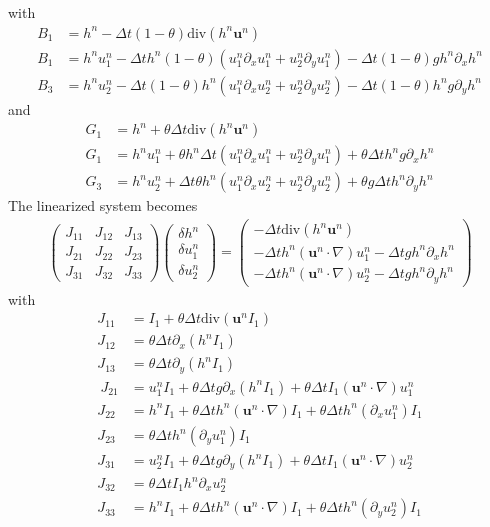 \documentclass[a4paper, 11pt]{article}
\begin{document}
with
\begin{align*}
B_{1} &= h^n-\Delta t(1-\theta)\text{div}(h^n\boldsymbol{u}^n)\\
B_{1} & = h^nu_1^n-\Delta th^n(1-\theta)(u_1^n\partial_xu_1^n+u_2^n\partial_yu_1^n)-\Delta t(1-\theta)gh^n\partial_xh^n\\
B_{3} & = h^nu_2^n-\Delta t(1-\theta)h^n(u_1^n\partial_xu_2^n+u_2^n\partial_yu_2^n)-\Delta t(1-\theta)h^ng\partial_yh^n
\end{align*}
and
\begin{align*}
G_{1} &= h^n+\theta\Delta t\text{div}(h^n\boldsymbol{u}^n) \\
G_{1} & = h^nu_1^n+\theta h^n\Delta t(u_1^n\partial_xu_1^n+u_2^n\partial_yu_1^n)+\theta\Delta th^ng\partial_xh^n\\
G_{3} & = h^nu_2^n+\Delta t\theta h^n(u_1^n\partial_xu_2^n+u_2^n\partial_yu_2^n)+\theta g\Delta th^n\partial_yh^n
\end{align*}
The linearized system becomes
\begin{equation*}
\begin{split}
\begin{pmatrix}
J_{11} & J_{12} & J_{13} \\
J_{21}& J_{22}& J_{23}\\
J_{31}& J_{32}& J_{33}
\end{pmatrix}\begin{pmatrix}
\delta h^n\\\delta u_1^n\\\delta u_2^n\end{pmatrix}
=\begin{pmatrix}-\Delta t\text{div}(h^n\boldsymbol{u}^n)\\-\Delta th^n\left(\boldsymbol{u}^n\cdot\nabla\right)u_1^n-\Delta tgh^n\partial_xh^n\\-\Delta th^n\left(\boldsymbol{u}^n\cdot\nabla\right)u_2^n-\Delta tgh^n\partial_y h^n\end{pmatrix}
\end{split}
\end{equation*}
with
\begin{align*}
J_{11} &=  I_1+\theta\Delta t\text{div}\left(\boldsymbol{u}^nI_1\right)\\
J_{12} & = \theta\Delta t\partial_x\left(h^nI_1\right)\\
J_{13} & =\theta\Delta t\partial_y\left(h^nI_1\right)\\\
J_{21} &= u^n_1I_1+\theta\Delta t g\partial_x\left(h^nI_1\right)+\theta\Delta tI_1\left(\boldsymbol{u}^n\cdot\nabla\right)u_1^n\\
J_{22} &= h^nI_1+\theta\Delta th^n\left(\boldsymbol{u}^n\cdot \nabla\right)I_1+\theta\Delta th^n(\partial_xu_1^n)I_1\\
J_{23} &= \theta\Delta th^n(\partial_yu_1^n)I_1\\
J_{31} &= u_2^nI_1+\theta\Delta tg\partial_y\left(h^nI_1\right)+\theta\Delta tI_1\left(\boldsymbol{u}^n\cdot\nabla\right)u_2^n\\
J_{32} &= \theta\Delta tI_1h^n\partial_xu_2^n \\
J_{33} &= h^nI_1+\theta\Delta th^n\left(\boldsymbol{u}^n\cdot\nabla\right)I_1+\theta\Delta th^n(\partial_yu_2^n)I_1
\end{align*}
\end{document}
